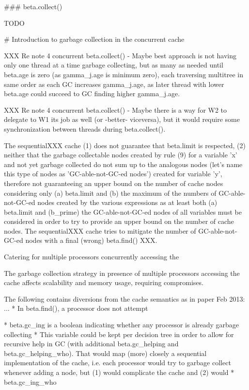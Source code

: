 \documentclass{article}
\begin{document}
### beta.collect()

TODO



# Introduction to garbage collection in the concurrent cache

XXX Re note 4 concurrent beta.collect() - Maybe best approach is not having only one thread at a time garbage collecting, but as many as needed until beta.age is zero (as gamma_j.age is minimum zero), each traversing multitree in same order as each GC increases gamma_j.age, as later thread with lower beta.age could succeed to GC finding higher gamma_j.age.

XXX Re note 4 concurrent beta.collect() - Maybe there is a way for W2 to delegate to W1 its job as well (or -better- viceversa), but it would require some synchronization between threads during beta.collect().


The sequentialXXX cache (1) does not guarantee that beta.limit is respected, (2) neither that the garbage collectable nodes created by rule (9) for a variable 'x' and not yet garbage collected do not sum up to the analogous nodes (let's name this type of nodes as 'GC-able-not-GC-ed nodes') created for variable 'y', therefore not guaranteeing an upper bound on the number of cache nodes considering only (a) beta.limit and (b) the maximum of the numbers of GC-able-not-GC-ed nodes created by the various expressions as at least both (a) beta.limit and (b_prime) the GC-able-not-GC-ed nodes of all variables must be considered in order to try to provide an upper bound on the number of cache nodes.
The sequentialXXX cache tries to mitigate the number of GC-able-not-GC-ed nodes with a final (wrong) beta.find() XXX.






Catering for multiple processors concurrently accessing the 

The garbage collection strategy in presence of multiple processors accessing the cache affects scalability and memory usage, requiring compromises.



The following contains diversions from the cache semantics as in paper Feb 2013:
...
* In beta.find(), a processor does not attempt 

* beta.gc_ing is a boolean indicating whether any processor is already garbage collecting
  * This variable could be kept per decision tree in order to allow for recursive help in GC (with additional beta.gc_helping and beta.gc_helping_who). That would map (more) closely a sequential implementation of the cache, i.e. each processor would try to garbage collect whenever adding a node, but (1) would complicate the cache and (2) would 
* beta.gc_ing_who
\end{document}
